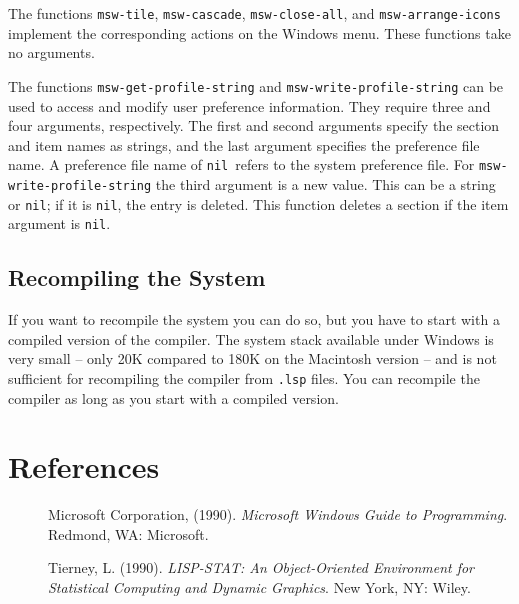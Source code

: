 \documentclass[11pt]{article}
\newcommand{\lfun}[1]{{\tt #1}}
\newcommand{\NIL}{{\tt nil}}
\begin{document}
The functions \lfun{msw-tile}, \lfun{msw-cascade},
\lfun{msw-close-all}, and \lfun{msw-arrange-icons} implement the
corresponding actions on the Windows menu. These functions take no
arguments.

The functions \lfun{msw-get-profile-string} and
\lfun{msw-write-profile-string} can be used to access and modify user
preference information.  They require three and four arguments,
respectively. The first and second arguments specify the section and
item names as strings, and the last argument specifies the preference
file name. A preference file name of \NIL\ refers to the system
preference file. For \lfun{msw-write-profile-string} the third
argument is a new value. This can be a string or \NIL; if it is \NIL,
the entry is deleted. This function deletes a section if the item
argument is \NIL.

\subsection{Recompiling the System}
If you want to recompile the system you can do so, but you have to
start with a compiled version of the compiler. The system stack
available under Windows is very small -- only 20K compared to 180K on
the Macintosh version -- and is not sufficient for recompiling the
compiler from {\tt .lsp} files. You can recompile the compiler as long
as you start with a compiled version.

\section*{References}
\begin{description}
\item[]
Microsoft Corporation, (1990). {\em Microsoft Windows Guide to
Programming}.  Redmond, WA: Microsoft.
\item[]
Tierney, L. (1990). {\em LISP-STAT: An Object-Oriented Environment for
Statistical Computing and Dynamic Graphics}. New York, NY: Wiley.
\end{description}
\end{document}
